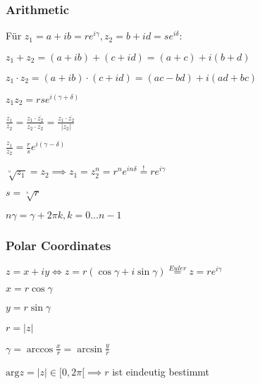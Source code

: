 \subsubsection{Arithmetic}
Für $z_1 = a + ib = re^{i \gamma}, z_2 = b + id = se^{i \delta}$:
\begin{compactitem}
    \item $z_1 + z_2 = (a + ib) + (c + id) = (a + c) + i(b + d)$
    \item $z_1 \cdot z_2 = (a + ib) \cdot (c + id) = (ac - bd) + i(ad + bc)$
        \begin{compactitem}
            \item $z_1 z_2 = rse^{i(\gamma + \delta)}$
        \end{compactitem}
    \item $\frac{z_1}{z_2} = \frac{z_1 \cdot \overline{z_2}}{z_2 \cdot \overline{z_2}}= \frac{z_1 \cdot \overline{z_2}}{|z_2|}$
        \begin{compactitem}
            \item $\frac{z_1}{z_2} = \frac{r}{s}e^{i(\gamma - \delta)}$
        \end{compactitem}
        \item $\sqrt[^n]{z_1} = z_2 \implies z_1 = z_2^n = r^ne^{i n \delta} \overset{!}{=} re^{i\gamma}$
            \begin{compactitem}
                \item $s = \sqrt[^n]{r}$
                \item $n \gamma = \gamma + 2 \pi k, k = 0\dots n - 1$
            \end{compactitem}
\end{compactitem}

\subsubsection{Polar Coordinates}
$z = x + iy \iff z = r(\cos \gamma + i \sin \gamma) \overset{Euler}{=} z = r e^{i \gamma}$
\begin{compactitem}
    \item
        \begin{inparaitem}
            \item $x = r \cos \gamma$
            \item $y = r \sin \gamma$
        \end{inparaitem}
    \item $r = |z|$
    \item $\gamma = \arccos \frac{x}{r} = \arcsin \frac{y}{r}$
    \item $\text{arg}z = |z| \in [0, 2\pi[ \implies r$ ist eindeutig bestimmt
\end{compactitem}

